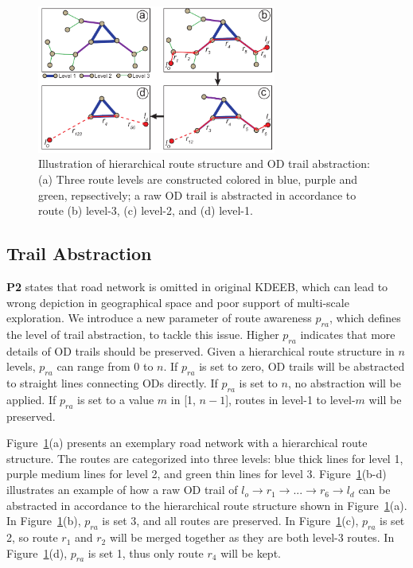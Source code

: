 \begin{figure}[t]
	\centering
	\includegraphics[width=0.7\textwidth]{figure/edgebundling/fig4_od_abstraction/OD_Abstraction.pdf}
	\vspace{-3mm}
	\caption{Illustration of hierarchical route structure and OD trail abstraction:
	(a) Three route levels are constructed colored in blue, purple and green, repsectively; a raw OD trail is abstracted in accordance to route (b) level-3, (c) level-2, and (d) level-1.}
	\label{fig:road_hierarchy}
	\vspace{-1mm}
\end{figure}

\subsection{Trail Abstraction}
\label{section: trail_abstraction}

\textbf{P2} states that road network is omitted in original KDEEB, which can lead to wrong depiction in geographical space and poor support of multi-scale exploration.
We introduce a new parameter of route awareness $p_{ra}$, which defines the level of trail abstraction, to tackle this issue.
Higher $p_{ra}$ indicates that more details of OD trails should be preserved.
Given a hierarchical route structure in $n$ levels, $p_{ra}$ can range from 0 to $n$.
If $p_{ra}$ is set to zero, OD trails will be abstracted to straight lines connecting ODs directly.
If $p_{ra}$ is set to $n$, no abstraction will be applied.
If $p_{ra}$ is set to a value $m$ in [1, $n-1$], routes in level-1 to level-$m$ will be preserved.

Figure~\ref{fig:road_hierarchy}(a) presents an exemplary road network with a hierarchical route structure.
The routes are categorized into three levels: blue thick lines for level 1, purple medium lines for level 2, and green thin lines for level 3.
Figure~\ref{fig:road_hierarchy}(b-d) illustrates an example of how a raw OD trail of $l_o \rightarrow r_1 
\rightarrow...\rightarrow r_6 \rightarrow l_d$ can be abstracted in accordance to the hierarchical route structure shown in Figure~\ref{fig:road_hierarchy}(a).
In Figure~\ref{fig:road_hierarchy}(b), $p_{ra}$ is set 3, and all routes are preserved.
In Figure~\ref{fig:road_hierarchy}(c), $p_{ra}$ is set 2, so route $r_1$ and $r_2$ will be merged together as they are both level-3 routes.
In Figure~\ref{fig:road_hierarchy}(d), $p_{ra}$ is set 1, thus only route $r_4$ will be kept.